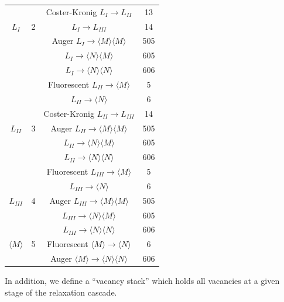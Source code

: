 \begin{table}[phtb]
\begin{center}
\begin{tabular}{|c|c|c|c|}
& & Coster-Kronig $L_I \to L_{II}$ & \phantom{0}13 \\
$L_I$ & 2 & \phantom{Coster-Kronig} $L_I \to L_{III}$ & \phantom{0}14 \\
& & Auger $L_I \to \langle M \rangle \langle M \rangle$ & 505 \\
& & \phantom{Auger} $L_I \to \langle N \rangle \langle M \rangle$ & 605 \\
& & \phantom{Auger} $L_I \to \langle N \rangle \langle N \rangle$ & 606 \\
\hline
& & Fluorescent $L_{II} \to \langle M \rangle$ & \phantom{00}5 \\
& & \phantom{Fluorescent} $L_{II} \to \langle N \rangle$ & \phantom{00}6 \\
& & Coster-Kronig $L_{II} \to L_{III} $ & \phantom{0}14 \\
$L_{II}$ & 3 & Auger $L_{II} \to \langle M \rangle \langle M \rangle$ & 505 \\
& & \phantom{Auger} $L_{II} \to \langle N \rangle \langle M \rangle$ & 605 \\
& & \phantom{Auger} $L_{II} \to \langle N \rangle \langle N \rangle$ & 606 \\
\hline
& & Fluorescent $L_{III} \to \langle M \rangle$ & \phantom{00}5 \\
& & \phantom{Fluorescent} $L_{III} \to \langle N \rangle$ & \phantom{00}6 \\
$L_{III}$ & 4 & Auger $L_{III} \to \langle M \rangle \langle M \rangle$ & 505 \\
& & \phantom{Auger} $L_{III} \to \langle N \rangle \langle M \rangle$ & 605 \\
& & \phantom{Auger} $L_{III} \to \langle N \rangle \langle N \rangle$ & 606 \\
\hline
$\langle M \rangle$ & 5 & Fluorescent 
$\langle M \rangle \to \langle N \rangle$  & 6 \\
& & Auger $\langle M \rangle \to \langle N \rangle 
\langle N \rangle$ & 606 \\
\hline \hline
\end{tabular}
\end{center}
\end{table}

In addition, we define a ``vacancy stack'' which holds all vacancies 
at a given stage of the relaxation cascade. 

